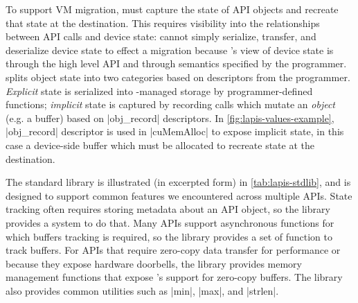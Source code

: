 { To support VM migration, \model must capture the state of API objects and recreate that state at the destination. This requires visibility into the relationships between API calls
and device state: \model cannot simply serialize, transfer, and deserialize device state to
effect a migration because \model's view of device state is through the high level API and through
semantics specified by the programmer.
\Model splits object state into two categories based on descriptors from the \model programmer.
\emph{Explicit} state is serialized into \model-managed storage by programmer-defined functions;
\emph{implicit} state is captured by recording calls which mutate an \emph{object} (e.g. a buffer) based on \spec|obj_record| descriptors. In \autoref{fig:lapis-values-example}, \spec|obj_record| descriptor is used in
\spec|cuMemAlloc| to expose implicit state, in this case a device-side buffer which must be allocated to recreate state at the destination.

The \speclang standard library is illustrated (in excerpted form) in \autoref{tab:lapis-stdlib},
and is designed to support common features we encountered across multiple APIs.
State tracking often requires storing metadata about an API object, so the library provides a system to do that.
Many APIs support asynchronous functions for which buffers tracking is required, so the library provides a set of function to track buffers.
For APIs that require zero-copy data transfer for performance or because they expose hardware doorbells, the library provides memory management functions that expose \model's support for zero-copy buffers.
The library also provides common utilities
such as \spec|min|, \spec|max|, and \spec|strlen|.





}
